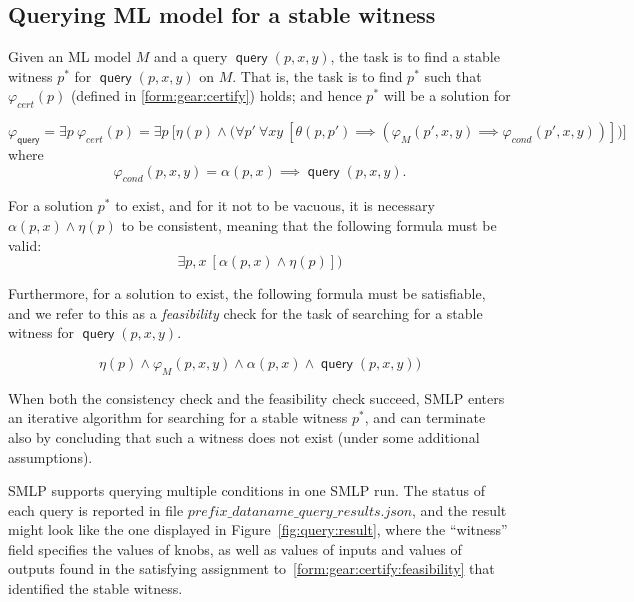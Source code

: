 \documentclass[a4paper,parskip=half]{article} %
\newcommand*\eqdef=
\newcommand*\query{\operatorname{\mathsf{query}}}
\begin{document}
\subsection{Querying ML model for a stable witness}

Given an ML model $M$  and a query $\query(p, x, y)$, the task is to find a stable witness $p^*$  for $\query(p, x, y)$ on $M$. 
That is, the task is to find $p^*$ such that $\varphi_{\mathit{cert}}(p)$ (defined in \cref{form:gear:certify}) holds;  
and hence $p^*$ will be a solution for 

\begin{equation}\label{form:gear:query:candidate}
\varphi_{\mathit{\query}} \eqdef \exists p~\varphi_{\mathit{cert}}(p)  \eqdef \exists p~ \big[ \eta(p) \wedge \big(
    \forall p'~
    \forall x y~[
   \theta(p, p') \implies (\varphi_M(p',x,y)  \implies  \varphi_{\mathit{cond}}(p',x,y))
    ]\big)\big]
\end{equation}
where \[\varphi_{\mathit{cond}}(p,x,y) \eqdef \alpha(p,x) \implies \query(p,x,y).\]


For a solution $p^*$ to exist, and for it not to be vacuous, it is necessary $\alpha(p, x) \wedge \eta(p)$ to be consistent, 
meaning that the following formula must be valid:
\begin{equation}\label{form:gear:query:consistency}
\exists p,x~ [\alpha(p, x) \wedge \eta(p)])
\end{equation}

Furthermore, for a solution to exist, the following formula must be satisfiable, and we refer to this as a \emph{feasibility} 
check for the task of searching for a stable witness for $\query(p,x,y)$. 

\begin{equation}\label{form:gear:query:feasibility}
       \eta(p) \wedge \varphi_M(p,x,y)  \wedge  \alpha(p,x) \wedge  \query(p,x,y))
\end{equation}

When both the consistency check and the feasibility check succeed, SMLP enters an iterative algorithm for
searching for a stable witness $p^*$, and can terminate also by concluding that such a witness does not exist 
(under some additional assumptions).


SMLP supports querying multiple conditions in one SMLP run. 
The status of each query is reported in file $prefix\_dataname\_query\_results.json$, 
and the result might look like the one displayed in Figure~\cref{fig:query:result}, where the ``witness'' field 
specifies the values of knobs, as well as values of inputs and values of outputs
found in the satisfying assignment to~\cref{form:gear:certify:feasibility} that identified the stable witness.
\end{document}
